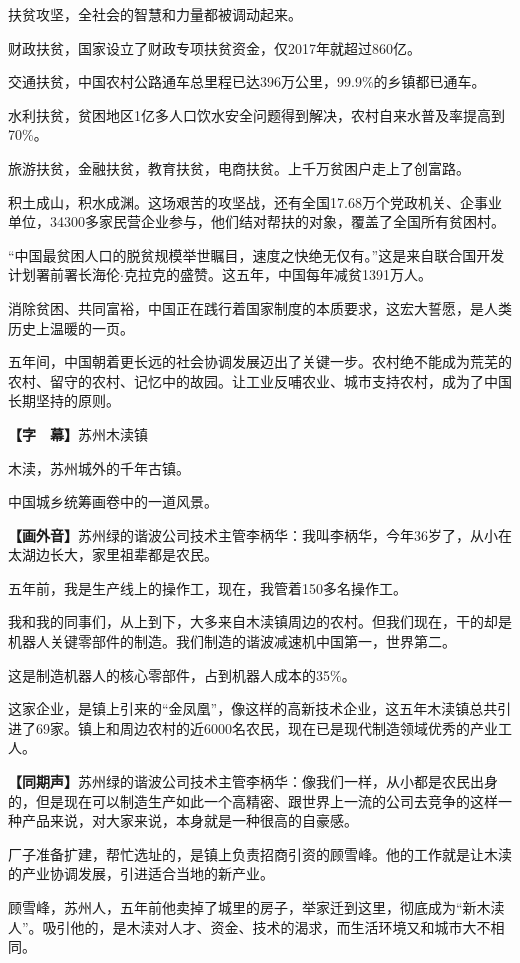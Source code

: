 \documentclass{ctexart}
\newcommand{\zkh}[1]{\textbf{\hspace{-2.7em} 【#1】}}
\begin{document}
扶贫攻坚，全社会的智慧和力量都被调动起来。

财政扶贫，国家设立了财政专项扶贫资金，仅2017年就超过860亿。

交通扶贫，中国农村公路通车总里程已达396万公里，99.9{\%}的乡镇都已通车。

水利扶贫，贫困地区1亿多人口饮水安全问题得到解决，农村自来水普及率提高到70{\%}。

旅游扶贫，金融扶贫，教育扶贫，电商扶贫。上千万贫困户走上了创富路。

积土成山，积水成渊。这场艰苦的攻坚战，还有全国17.68万个党政机关、企事业单位，34300多家民营企业参与，他们结对帮扶的对象，覆盖了全国所有贫困村。

``中国最贫困人口的脱贫规模举世瞩目，速度之快绝无仅有。''这是来自联合国开发计划署前署长海伦$\cdot 
$克拉克的盛赞。这五年，中国每年减贫1391万人。

消除贫困、共同富裕，中国正在践行着国家制度的本质要求，这宏大誓愿，是人类历史上温暖的一页。

五年间，中国朝着更长远的社会协调发展迈出了关键一步。农村绝不能成为荒芜的农村、留守的农村、记忆中的故园。让工业反哺农业、城市支持农村，成为了中国长期坚持的原则。

\zkh{字　幕}苏州木渎镇

木渎，苏州城外的千年古镇。

中国城乡统筹画卷中的一道风景。

\zkh{画外音}苏州绿的谐波公司技术主管李柄华：我叫李柄华，今年36岁了，从小在太湖边长大，家里祖辈都是农民。

五年前，我是生产线上的操作工，现在，我管着150多名操作工。

我和我的同事们，从上到下，大多来自木渎镇周边的农村。但我们现在，干的却是机器人关键零部件的制造。我们制造的谐波减速机中国第一，世界第二。

这是制造机器人的核心零部件，占到机器人成本的35{\%}。

这家企业，是镇上引来的``金凤凰''，像这样的高新技术企业，这五年木渎镇总共引进了69家。镇上和周边农村的近6000名农民，现在已是现代制造领域优秀的产业工人。

\zkh{同期声}苏州绿的谐波公司技术主管李柄华：像我们一样，从小都是农民出身的，但是现在可以制造生产如此一个高精密、跟世界上一流的公司去竞争的这样一种产品来说，对大家来说，本身就是一种很高的自豪感。

厂子准备扩建，帮忙选址的，是镇上负责招商引资的顾雪峰。他的工作就是让木渎的产业协调发展，引进适合当地的新产业。

顾雪峰，苏州人，五年前他卖掉了城里的房子，举家迁到这里，彻底成为``新木渎人''。吸引他的，是木渎对人才、资金、技术的渴求，而生活环境又和城市大不相同。
\end{document}

